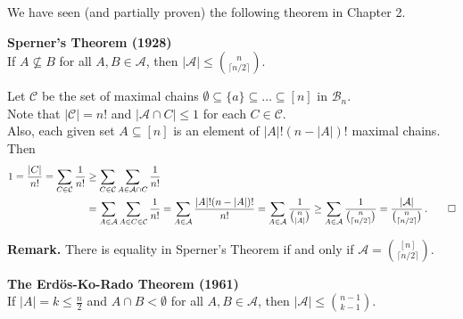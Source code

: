 \documentclass[a4paper]{article}
\let\oldendproof\endproof
\renewenvironment{proof}[1][\proofname]{%
  \oldproof[\scshape \noindent {\bfseries \text{Proof}}]%
}{\oldendproof}
\newenvironment{thm}[1]{
	\begin{framed}
	\noindent
	{\bfseries #1}\\}{\setlength{\itemsep}{0pt}
	\end{framed}
}
\newcommand{\Af}{\mathcal{A}}
\newcommand{\Bf}{\mathcal{B}}
\newcommand{\Cf}{\mathcal{C}}
\begin{document}
We have seen (and partially proven) the following theorem in Chapter 2.

\begin{thm}{Sperner's Theorem (1928)}
If $A \not\subseteq B$ for all $A,B \in \Af$, then $|\Af| \leq \binom{n}{\lceil n/2\rceil}$.
\end{thm}

\begin{proof}
Let $\Cf$ be the set of maximal chains $\emptyset \subseteq \{a\} \subseteq \dots \subseteq [n]$ in $\Bf_n$.\\
Note that $|\Cf| = n!$ and $|\Af \cap C| \leq 1$ for each $C\in \Cf$.\\
Also, each given set $A \subseteq [n]$ is an element of $|A|! (n-|A|)!$ maximal chains.
Then
\begin{align*}
	1
  = \frac{|C|}{n!}
  = \sum_{C \in \Cf} \frac{1}{n!}
 &\geq \sum_{C \in \Cf} \sum_{A \in \Af \cap C} \frac{1}{n!}\\
 &= \sum_{A \in \Af} \sum_{A\in C \in \Cf} \frac{1}{n!}
  = \sum_{A \in \Af} \frac{|A|! (n-|A|)!}{n!}
  = \sum_{A \in \Af} \frac{1}{\binom{n}{|A|}}
  \geq \sum_{A \in \Af}\frac{1}{\binom{n}{\lceil n/2 \rceil}}
  = \frac{|\Af|}{\binom{n}{\lceil n/2 \rceil}}\,.\qedhere
\end{align*}
\end{proof}

\noindent
{\bfseries Remark.}
There is equality in Sperner's Theorem if and only if $\Af = \binom{[n]}{\lceil n/2 \rceil}$.

\begin{thm}{The Erd\"os-Ko-Rado Theorem (1961)}
If $|A| = k \leq \frac{n}{2}$ and $A \cap B < \emptyset$ for all $A, B \in \Af$, then $|\Af| \leq \binom{n-1}{k-1}$.
\end{thm}
\end{document}
